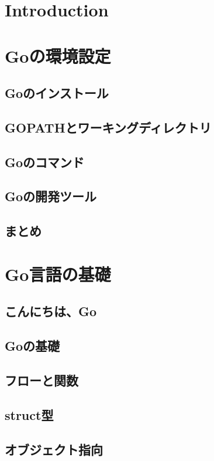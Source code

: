 \section{Introduction}


\section{Goの環境設定}

\subsection{Goのインストール}

\subsection{GOPATHとワーキングディレクトリ}

\subsection{Goのコマンド}

\subsection{Goの開発ツール}

\subsection{まとめ}



\section{Go言語の基礎}


\subsection{こんにちは、Go}

\subsection{Goの基礎}

\subsection{フローと関数}

\subsection{struct型}

\subsection{オブジェクト指向}

